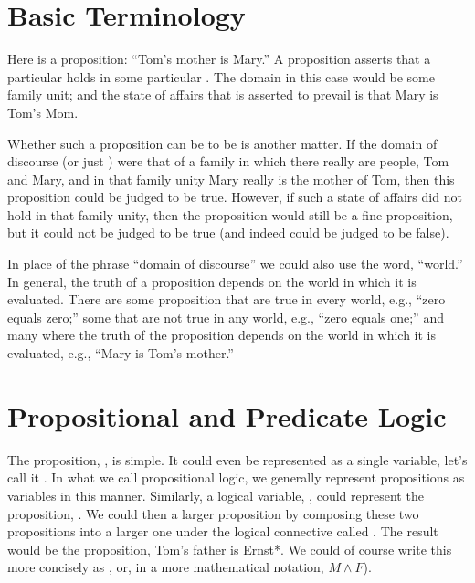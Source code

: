 \documentclass[letterpaper,10pt,english]{sphinxmanual}
\begin{document}
\section{Basic Terminology}
\label{\detokenize{09-propositional-logic:basic-terminology}}
Here is a proposition: “Tom’s mother is Mary.” A proposition asserts
that a particular  holds in some particular . The domain in this case would be some family unit; and
the state of affairs that is asserted to prevail is that Mary is Tom’s
Mom.

Whether such a proposition can be  to be  is another
matter. If the domain of discourse (or just ) were that of a
family in which there really are people, Tom and Mary, and in that
family unity Mary really is the mother of Tom, then this proposition
could be judged to be true. However, if such a state of affairs did
not hold in that family unity, then the proposition would still be a
fine proposition, but it could not be judged to be true (and indeed
could be judged to be false).

In place of the phrase “domain of discourse” we could also use the
word, “world.” In general, the truth of a proposition depends on the
world in which it is evaluated. There are some proposition that are
true in every world, e.g., “zero equals zero;” some that are not true
in any world, e.g., “zero equals one;” and many where the truth of the
proposition depends on the world in which it is evaluated, e.g., “Mary
is Tom’s mother.”


\section{Propositional and Predicate Logic}
\label{\detokenize{09-propositional-logic:propositional-and-predicate-logic}}
The proposition, , is simple. It could even be
represented as a single variable, let’s call it .  In what we call
propositional logic, we generally represent propositions as variables
in this manner. Similarly, a logical variable, , could represent
the proposition, .  We could then  a
larger proposition by composing these two propositions into a larger
one under the logical connective called . The result would be the
proposition,  Tom’s father is Ernst*. We
could of course write this more concisely as , or, in a more
mathematical notation, \(M \land F\)).
\end{document}
